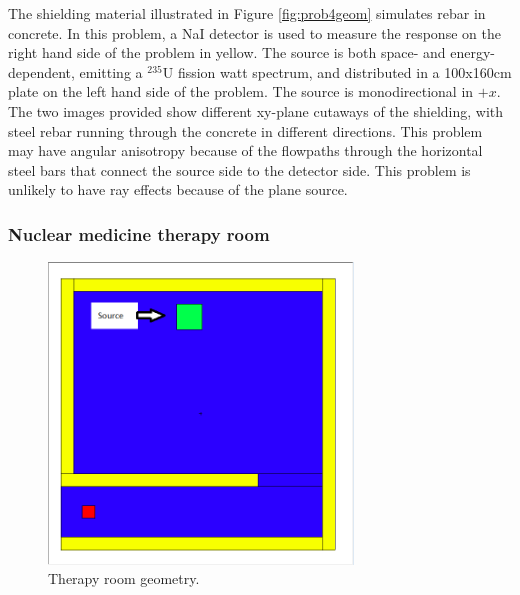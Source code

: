 The shielding material illustrated in Figure \ref{fig:prob4geom} simulates rebar in concrete. In this problem, a NaI detector is
used to measure the response on the right hand side of the problem in yellow.
The source is both space- and energy-dependent, emitting a $^{235}$U  fission watt spectrum, and distributed in a 100x160cm plate
on the left hand side of the problem. The source is monodirectional in $+x$.
The two images provided show
different xy-plane cutaways of the shielding, with steel rebar running through
the concrete in different directions. This problem may have angular
anisotropy because of the flowpaths through the horizontal steel bars that connect
the source side to the detector side. 
 This problem 
is unlikely to have ray effects because of the plane source.

\subsubsection*{Nuclear medicine therapy room}

\begin{figure}[h!]
  \centering
  \includegraphics[height=8cm]{./chapters/characterization_probs/figures/geometries/therapy-room.png}
  \caption[Nuclear medicine therapy room.]{Therapy room geometry.}
  \label{fig:therapygeom}
\end{figure}

